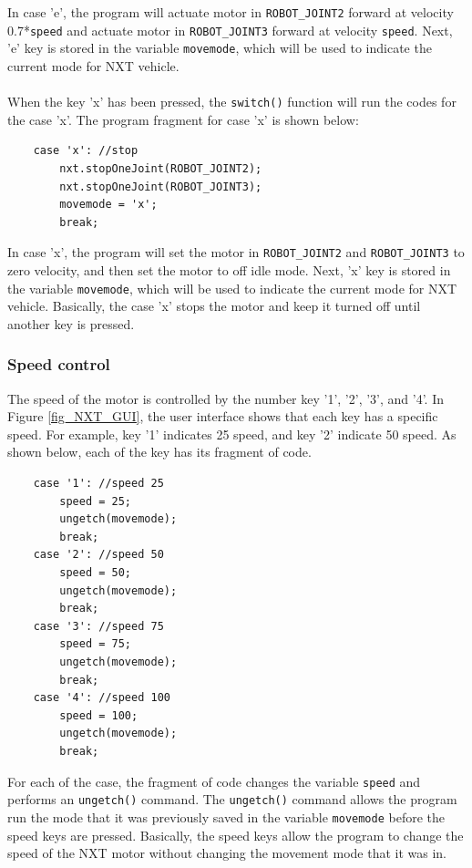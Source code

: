 In case 'e', the program will actuate motor in \verb+ROBOT_JOINT2+ forward at velocity 
0.7*\verb+speed+ and actuate motor in \verb+ROBOT_JOINT3+ forward at velocity \verb+speed+. Next, 'e'
key is stored in the variable \verb+movemode+, which will be used to indicate the current mode for 
NXT vehicle.
\\ \\
\noindent
When the key 'x' has been pressed, the \verb+switch()+ function will run the codes for the case 'x'.
The program fragment for case 'x' is shown below:
\begin{verbatim} 
    case 'x': //stop
        nxt.stopOneJoint(ROBOT_JOINT2);
        nxt.stopOneJoint(ROBOT_JOINT3);
        movemode = 'x';
        break;
\end{verbatim}
In case 'x', the program will set the motor in \verb+ROBOT_JOINT2+ and \verb+ROBOT_JOINT3+ to zero 
velocity, and then set the motor to off idle mode. Next, 'x' key is stored in the variable 
\verb+movemode+, which will be used to indicate the current mode for NXT vehicle.
Basically, the case 'x' stops the motor and keep it turned off until another key is pressed.

\subsubsection*{Speed control}
The speed of the motor is controlled by the number key '1', '2', '3', and '4'.
In Figure \ref{fig_NXT_GUI}, the user interface shows that each key has a specific speed.
For example, key '1' indicates 25 speed, and key '2' indicate 50 speed.
As shown below, each of the key has its fragment of code.

\begin{verbatim}
    case '1': //speed 25
        speed = 25;
        ungetch(movemode);
        break;
    case '2': //speed 50
        speed = 50;
        ungetch(movemode);
        break;
    case '3': //speed 75
        speed = 75;
        ungetch(movemode);
        break;
    case '4': //speed 100
        speed = 100;
        ungetch(movemode);
        break;
\end{verbatim}
\noindent
For each of the case, the fragment of code changes the variable \verb+speed+ and performs an \verb+ungetch()+ command.
The \verb+ungetch()+ command allows the program run the mode that it was previously saved in the variable \verb+movemode+
before the speed keys are pressed. Basically, the speed keys allow the program to change the speed of the NXT motor without 
changing the movement mode that it was in.


